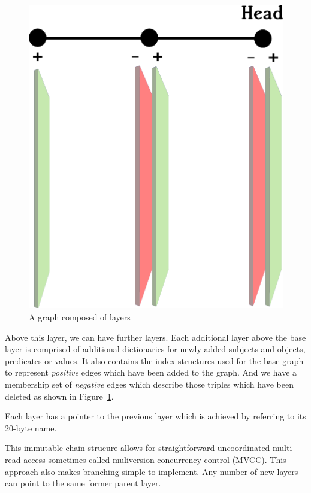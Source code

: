 \documentclass[10pt, a4paper, twocolumn]{article} %
\begin{document}
\begin{figure}
	\includegraphics[width=\linewidth]{layers-diagram.png} %
	\caption{A graph composed of layers} %
	\label{fig:layers} %
\end{figure}

Above this layer, we can have further layers. Each additional layer
above the base layer is comprised of additional dictionaries for newly
added subjects and objects, predicates or values. It also contains the
index structures used for the base graph to represent {\em positive}
edges which have been added to the graph. And we have a membership set
of {\em negative} edges which describe those triples which have been
deleted as shown in Figure~\ref{fig:layers}.

Each layer has a pointer to the previous layer which is achieved by
referring to its 20-byte name.

This immutable chain strucure allows for straightforward uncoordinated
multi-read access sometimes called muliversion concurrency control
(MVCC)\cite{Mohan:1992:EFM:130283.130306}\cite{Sadoghi:2014:RDL:2733004.2733006}. This
approach also makes branching simple to implement. Any number of new
layers can point to the same former parent layer.
\end{document}
